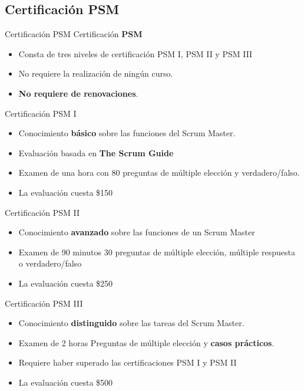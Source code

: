 \subsection{Certificación PSM}

\begin{frame}[allowframebreaks]{Certificación PSM}
	Certificación \textbf{PSM} 

	\begin{itemize}
		\item Consta de tres niveles de certificación PSM I, PSM II y PSM III
		\item No requiere la realización de ningún curso.
		\item \textbf{No requiere de renovaciones}.
	\end{itemize}

	\framebreak

	Certificación PSM I
	\begin{itemize}
		\item Conocimiento \textbf{básico} sobre las funciones del Scrum Master.
		\item Evaluación basada en \textbf{The Scrum Guide}
		\item Examen de una hora con 80 preguntas de múltiple elección y
		      verdadero/falso.
		\item La evaluación cuesta \$150
	\end{itemize}

	\framebreak

	Certificación PSM II
	\begin{itemize}
		\item Conocimiento \textbf{avanzado} sobre las funciones de un Scrum Master
		\item Examen de 90 minutos 30 preguntas de múltiple elección,
		      múltiple respuesta o  verdadero/falso
		\item La evaluación cuesta \$250
	\end{itemize}

	\framebreak

	Certificación PSM III
	\begin{itemize}
		\item Conocimiento \textbf{distinguido} sobre las tareas 
		      del Scrum Master.
		\item Examen de 2 horas Preguntas de múltiple elección y 
		      \textbf{casos prácticos}.
		\item Requiere haber superado las certificaciones PSM I y PSM II
		\item La evaluación cuesta \$500
	\end{itemize}


\end{frame}


